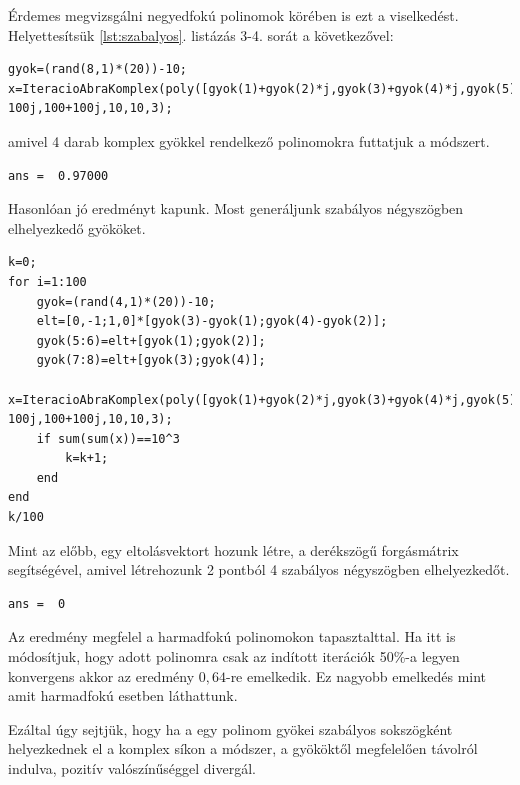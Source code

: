 \documentclass[a4paper,12pt]{report}
\begin{document}
Érdemes megvizsgálni negyedfokú polinomok körében is ezt a viselkedést. Helyettesítsük \ref{lst:szabalyos}. listázás 3-4. sorát a következővel:
\begin{singlespace}
\begin{lstlisting}[firstnumber=3]
gyok=(rand(8,1)*(20))-10;
x=IteracioAbraKomplex(poly([gyok(1)+gyok(2)*j,gyok(3)+gyok(4)*j,gyok(5)+gyok(6)*j,gyok(7)+gyok(8)*j]),-100-100j,100+100j,10,10,3);
\end{lstlisting}
\end{singlespace}
amivel 4 darab komplex gyökkel rendelkező polinomokra futtatjuk a módszert.
                \begin{singlespace}
                \begin{lstlisting}[caption=Eredm\'eny]
ans =  0.97000
                \end{lstlisting}
                \end{singlespace}
Hasonlóan jó eredményt kapunk. Most generáljunk szabályos négyszögben elhelyezkedő gyököket.
\begin{singlespace}
\begin{lstlisting}[caption=Bemenet]
k=0;
for i=1:100
    gyok=(rand(4,1)*(20))-10;
    elt=[0,-1;1,0]*[gyok(3)-gyok(1);gyok(4)-gyok(2)];
    gyok(5:6)=elt+[gyok(1);gyok(2)];
    gyok(7:8)=elt+[gyok(3);gyok(4)];
    x=IteracioAbraKomplex(poly([gyok(1)+gyok(2)*j,gyok(3)+gyok(4)*j,gyok(5)+gyok(6)*j,gyok(7)+gyok(8)*j]),-100-100j,100+100j,10,10,3);
    if sum(sum(x))==10^3
        k=k+1;
    end
end
k/100
\end{lstlisting}
\end{singlespace}
Mint az előbb, egy eltolásvektort hozunk létre, a derékszögű forgásmátrix segítségével, amivel létrehozunk 2 pontból 4 szabályos négyszögben elhelyezkedőt.
                \begin{singlespace}
                \begin{lstlisting}[caption=Eredm\'eny]
ans =  0
                \end{lstlisting}
                \end{singlespace}
Az eredmény megfelel a harmadfokú polinomokon tapasztalttal. Ha itt is módosítjuk, hogy adott polinomra csak az indított iterációk 50\%-a legyen konvergens akkor az eredmény $0,\!64$-re emelkedik. Ez nagyobb emelkedés mint amit harmadfokú esetben láthattunk.

Ezáltal úgy sejtjük, hogy ha a egy polinom gyökei szabályos sokszögként helyezkednek el a komplex síkon a módszer, a gyököktől megfelelően távolról indulva, pozitív valószínűséggel divergál.
\end{document}
